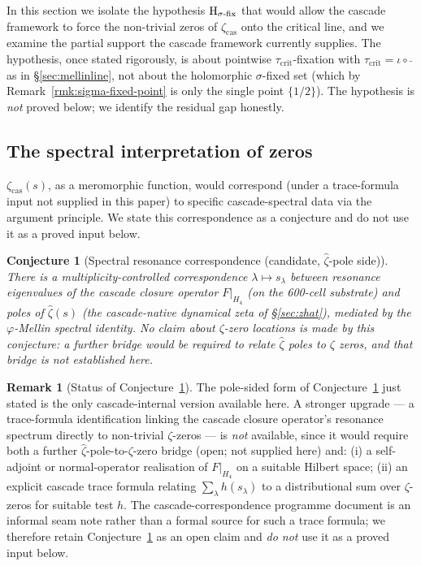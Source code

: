 \documentclass[11pt, a4paper]{amsart}
\newtheorem{conjecture}[theorem]{Conjecture}
\theoremstyle{definition}
\newtheorem{remark}[theorem]{Remark}
\newcommand{\pphi}{\varphi}
\newcommand{\zetacas}{\zeta_{\mathrm{cas}}}
\begin{document}
In this section we isolate the hypothesis
$\textup{H}_{\sigma\text{-fix}}$ that would allow the cascade
framework to force the non-trivial zeros of $\zetacas$ onto the
critical line, and we examine the partial support the cascade
framework currently supplies. The hypothesis, once stated
rigorously, is about pointwise $\tau_{\mathrm{crit}}$-fixation with
$\tau_{\mathrm{crit}} = \iota \circ \bar{\ }$ as in
\S\ref{sec:mellinline}, not about the
holomorphic $\sigma$-fixed set (which by
Remark~\ref{rmk:sigma-fixed-point} is only the single point
$\{1/2\}$). The hypothesis is \emph{not} proved
below; we identify the residual gap honestly.

\subsection{The spectral interpretation of zeros}

$\zetacas(s)$, as a meromorphic function, would correspond (under
a trace-formula input not supplied in this paper) to specific
cascade-spectral data via the argument principle. We state this
correspondence as a conjecture and do not use it as a proved input
below.

\begin{conjecture}[Spectral resonance correspondence (candidate, $\widehat\zeta$-pole side)]\label{conj:zerosreson}
There is a multiplicity-controlled correspondence
$\lambda \mapsto s_\lambda$ between resonance eigenvalues of the
cascade closure operator $F|_{H_4}$ (on the 600-cell substrate)
and \emph{poles of $\widehat\zeta(s)$} (the cascade-native
dynamical zeta of \S\ref{sec:zhat}), mediated by the $\pphi$-Mellin
spectral identity.  No claim about $\zeta$-zero locations is made by
this conjecture: a further bridge would be required to relate
$\widehat\zeta$ poles to $\zeta$ zeros, and that bridge is not
established here.
\end{conjecture}

\begin{remark}[Status of Conjecture~\ref{conj:zerosreson}]\label{rmk:zerosreson_status}
The pole-sided form of Conjecture~\ref{conj:zerosreson} just stated
is the only cascade-internal version available here.  A stronger
upgrade --- a trace-formula identification linking the cascade
closure operator's resonance spectrum directly to non-trivial
$\zeta$-zeros --- is \emph{not} available, since it would require
both a further $\widehat\zeta$-pole-to-$\zeta$-zero bridge (open;
not supplied here) and: (i) a self-adjoint or normal-operator
realisation of $F|_{H_4}$ on a suitable Hilbert space; (ii) an
explicit cascade trace formula relating $\sum_\lambda h(s_\lambda)$
to a distributional sum over $\zeta$-zeros for suitable test $h$.
The cascade-correspondence programme document
\cite{CascadeRH} is an informal seam note rather than a formal
source for such a trace formula; we therefore retain
Conjecture~\ref{conj:zerosreson} as an open claim and \emph{do not}
use it as a proved input below.
\end{remark}
\end{document}
